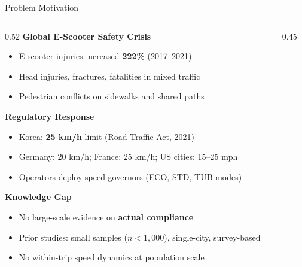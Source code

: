 \documentclass[aspectratio=169, 9pt]{beamer}
\begin{document}
\begin{frame}{Problem Motivation}
\begin{columns}[T]
\begin{column}{0.52\textwidth}
  \footnotesize
  \textbf{\textcolor{boxblue}{Global E-Scooter Safety Crisis}}
  \begin{itemize}\setlength\itemsep{1pt}
    \item E-scooter injuries increased \textbf{222\%} (2017--2021)
    \item Head injuries, fractures, fatalities in mixed traffic
    \item Pedestrian conflicts on sidewalks and shared paths
  \end{itemize}

  \vspace{4pt}
  \textbf{\textcolor{boxblue}{Regulatory Response}}
  \begin{itemize}\setlength\itemsep{1pt}
    \item Korea: \textbf{25 km/h} limit (Road Traffic Act, 2021)
    \item Germany: 20 km/h; France: 25 km/h; US cities: 15--25 mph
    \item Operators deploy speed governors (ECO, STD, TUB modes)
  \end{itemize}

  \vspace{4pt}
  \textbf{\textcolor{boxblue}{Knowledge Gap}}
  \begin{itemize}\setlength\itemsep{1pt}
    \item No large-scale evidence on \textbf{actual compliance}
    \item Prior studies: small samples ($n < 1{,}000$), single-city, survey-based
    \item No within-trip speed dynamics at population scale
  \end{itemize}
\end{column}
\begin{column}{0.45\textwidth}
  \centering
  \vspace{4pt}


\end{column}
\end{columns}
\end{frame}
\end{document}
